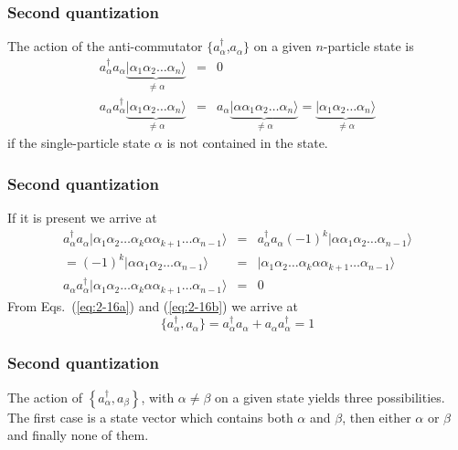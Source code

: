 \documentclass{beamer}
\begin{document}
\begin{frame}
\frametitle{Second quantization}

\begin{block}{}
The action of the anti-commutator 
$\{a_\alpha^{\dagger}$,$a_\alpha\}$ on a given $n$-particle state is
\begin{eqnarray}
	a_\alpha^{\dagger} a_\alpha \underbrace{|\alpha_1\alpha_2 \dots \alpha_{n}\rangle}_{\neq \alpha} &=& 0 \nonumber \\
	a_\alpha a_\alpha^{\dagger} \underbrace{|\alpha_1\alpha_2 \dots \alpha_{n}\rangle}_{\neq \alpha} &=&
	a_\alpha \underbrace{|\alpha \alpha_1\alpha_2 \dots \alpha_{n}\rangle}_{\neq \alpha} = 
	\underbrace{|\alpha_1\alpha_2 \dots \alpha_{n}\rangle}_{\neq \alpha} \label{eq:2-16a}
\end{eqnarray}
if the single-particle state $\alpha$ is not contained in the state.
\end{block}
\end{frame}

\begin{frame}
\frametitle{Second quantization}

\begin{block}{}
 If it is present
we arrive at
\begin{eqnarray}
	a_\alpha^{\dagger} a_\alpha |\alpha_1\alpha_2 \dots \alpha_{k}\alpha \alpha_{k+1} \dots \alpha_{n-1}\rangle &=&
	a_\alpha^{\dagger} a_\alpha (-1)^k |\alpha \alpha_1\alpha_2 \dots \alpha_{n-1}\rangle \nonumber \\
	= (-1)^k |\alpha \alpha_1\alpha_2 \dots \alpha_{n-1}\rangle &=& 
	|\alpha_1\alpha_2 \dots \alpha_{k}\alpha \alpha_{k+1} \dots \alpha_{n-1}\rangle \nonumber \\
	a_\alpha a_\alpha^{\dagger}|\alpha_1\alpha_2 \dots \alpha_{k}\alpha \alpha_{k+1} \dots \alpha_{n-1}\rangle &=& 0 \label{eq:2-16b}
\end{eqnarray}
From Eqs.~(\ref{eq:2-16a}) and  (\ref{eq:2-16b}) we arrive at 
\begin{equation}
	\{a_\alpha^{\dagger} , a_\alpha \} = a_\alpha^{\dagger} a_\alpha + a_\alpha a_\alpha^{\dagger} = 1 \label{eq:2-17}
\end{equation}
\end{block}
\end{frame}

\begin{frame}
\frametitle{Second quantization}

\begin{block}{}
The action of $\left\{a_\alpha^{\dagger}, a_\beta\right\}$, with 
$\alpha \ne \beta$ on a given state yields three possibilities. 
The first case is a state vector which contains both $\alpha$ and $\beta$, then either 
$\alpha$ or $\beta$ and finally none of them.
\end{block}
\end{frame}
\end{document}
